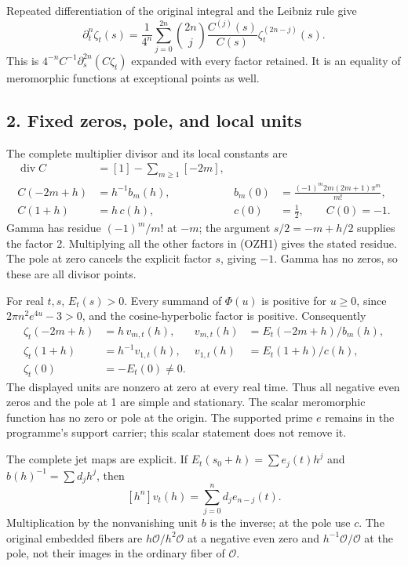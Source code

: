 \documentclass[
  10pt,
  a4paper,
]{article}
\begin{document}
Repeated differentiation of the original integral and the Leibniz rule
give \[
\partial_t^n\zeta_t(s)=
\frac1{4^n}\sum_{j=0}^{2n}\binom{2n}{j}
\frac{C^{(j)}(s)}{C(s)}\zeta_t^{(2n-j)}(s).
\tag{OZH4}
\] This is \(4^{-n}C^{-1}\partial_s^{2n}(C\zeta_t)\) expanded with every
factor retained. It is an equality of meromorphic functions at
exceptional points as well.

\subsection{2. Fixed zeros, pole, and local
units}\label{fixed-zeros-pole-and-local-units}

The complete multiplier divisor and its local constants are \[
\begin{aligned}
\operatorname{div}C&=[1]-\sum_{m\ge1}[-2m],\\
C(-2m+h)&=h^{-1}b_m(h),&
b_m(0)&=\frac{(-1)^m2m(2m+1)\pi^m}{m!},\\
C(1+h)&=h\,c(h),&c(0)&=\frac12,\qquad C(0)=-1 .
\end{aligned}\tag{OZH5}
\] Gamma has residue \((-1)^m/m!\) at \(-m\); the argument
\(s/2=-m+h/2\) supplies the factor 2. Multiplying all the other factors
in (OZH1) gives the stated residue. The pole at zero cancels the
explicit factor \(s\), giving \(-1\). Gamma has no zeros, so these are
all divisor points.

For real \(t,s\), \(E_t(s)>0\). Every summand of \(\Phi(u)\) is positive
for \(u\ge0\), since \(2\pi n^2e^{4u}-3>0\), and the cosine-hyperbolic
factor is positive. Consequently \[
\begin{aligned}
\zeta_t(-2m+h)&=h\,v_{m,t}(h),&
v_{m,t}(h)&=E_t(-2m+h)/b_m(h),\\
\zeta_t(1+h)&=h^{-1}v_{1,t}(h),&
v_{1,t}(h)&=E_t(1+h)/c(h),\\
\zeta_t(0)&=-E_t(0)\ne0 .
\end{aligned}\tag{OZH6}
\] The displayed units are nonzero at zero at every real time. Thus all
negative even zeros and the pole at 1 are simple and stationary. The
scalar meromorphic function has no zero or pole at the origin. The
supported prime \(e\) remains in the programme's support carrier; this
scalar statement does not remove it.

The complete jet maps are explicit. If \(E_t(s_0+h)=\sum e_j(t)h^j\) and
\(b(h)^{-1}=\sum d_jh^j\), then \[
[h^n]v_t(h)=\sum_{j=0}^n d_j e_{n-j}(t).
\tag{OZH7}
\] Multiplication by the nonvanishing unit \(b\) is the inverse; at the
pole use \(c\). The original embedded fibers are
\(h\mathcal O/h^2\mathcal O\) at a negative even zero and
\(h^{-1}\mathcal O/\mathcal O\) at the pole, not their images in the
ordinary fiber of \(\mathcal O\).
\end{document}
